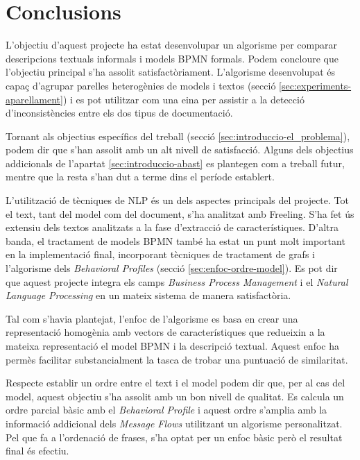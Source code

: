 \chapter{Conclusions}


L'objectiu d'aquest projecte ha estat desenvolupar un algorisme per comparar descripcions textuals informals i models BPMN formals. Podem concloure que l'objectiu principal s'ha assolit satisfactòriament. L'algorisme desenvolupat és capaç d'agrupar parelles heterogènies de models i textos (secció \ref{sec:experiments-aparellament}) i es pot utilitzar com una eina per assistir a la detecció d'inconsistències entre els dos tipus de documentació. 

Tornant als objectius específics del treball (secció \ref{sec:introduccio-el_problema}), podem dir que s'han assolit amb un alt nivell de satisfacció. Alguns dels objectius addicionals de l'apartat \ref{sec:introduccio-abast} es plantegen com a treball futur, mentre que la resta s'han dut a terme dins el període establert.

L'utilització de tècniques de NLP és un dels aspectes principals del projecte. Tot el text, tant del model com del document, s'ha analitzat amb Freeling. S'ha fet ús extensiu dels textos analitzats a la fase d'extracció de característiques. D'altra banda, el tractament de models BPMN també ha estat un punt molt important en la implementació final, incorporant tècniques de tractament de grafs i l'algorisme dels \emph{Behavioral Profiles} (secció \ref{sec:enfoc-ordre-model}). Es pot dir que aquest projecte integra els camps \emph{Business Process Management} i el \emph{Natural Language Processing} en un mateix sistema de manera satisfactòria.

Tal com s'havia plantejat, l'enfoc de l'algorisme es basa en crear una representació homogènia amb vectors de característiques que redueixin a la mateixa representació el model BPMN i la descripció textual. Aquest enfoc ha permès facilitar substancialment la tasca de trobar una puntuació de similaritat. 

Respecte establir un ordre entre el text i el model podem dir que, per al cas del model, aquest objectiu s'ha assolit amb un bon nivell de qualitat. Es calcula un ordre parcial bàsic amb el \emph{Behavioral Profile} i aquest ordre s'amplia amb la informació addicional dels \emph{Message Flows} utilitzant un algorisme personalitzat. Pel que fa a l'ordenació de frases, s'ha optat per un enfoc bàsic però el resultat final és efectiu.

